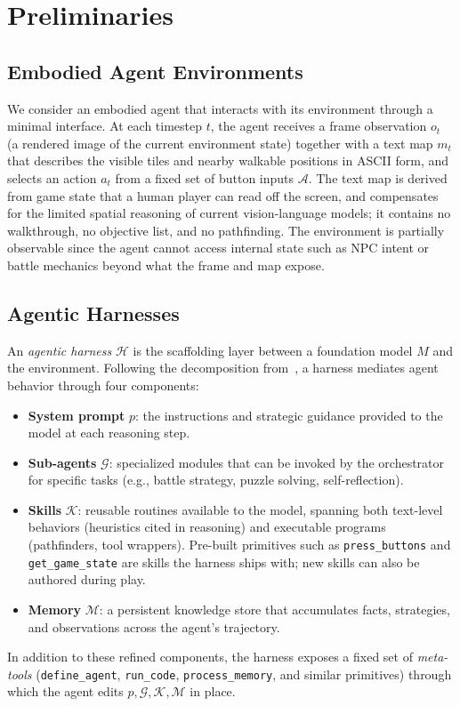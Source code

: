 \documentclass[11pt]{article}
\begin{document}
\section{Preliminaries}\label{sec:preliminaries}

\subsection{Embodied Agent Environments}

We consider an embodied agent that interacts with its environment through a minimal interface. At each timestep $t$, the agent receives a frame observation $o_t$ (a rendered image of the current environment state) together with a text map $m_t$ that describes the visible tiles and nearby walkable positions in ASCII form, and selects an action $a_t$ from a fixed set of button inputs $\mathcal{A}$. The text map is derived from game state that a human player can read off the screen, and compensates for the limited spatial reasoning of current vision-language models; it contains no walkthrough, no objective list, and no pathfinding. The environment is partially observable since the agent cannot access internal state such as NPC intent or battle mechanics beyond what the frame and map expose.

\subsection{Agentic Harnesses}

An \emph{agentic harness} $\mathcal{H}$ is the scaffolding layer between a foundation model $M$ and the environment. Following the decomposition from~\citet{karten2026pokeagent}, a harness mediates agent behavior through four components:
\begin{itemize}
    \item \textbf{System prompt} $p$: the instructions and strategic guidance provided to the model at each reasoning step.
    \item \textbf{Sub-agents} $\mathcal{G}$: specialized modules that can be invoked by the orchestrator for specific tasks (e.g., battle strategy, puzzle solving, self-reflection).
    \item \textbf{Skills} $\mathcal{K}$: reusable routines available to the model, spanning both text-level behaviors (heuristics cited in reasoning) and executable programs (pathfinders, tool wrappers). Pre-built primitives such as \texttt{press\_buttons} and \texttt{get\_game\_state} are skills the harness ships with; new skills can also be authored during play.
    \item \textbf{Memory} $\mathcal{M}$: a persistent knowledge store that accumulates facts, strategies, and observations across the agent's trajectory.
\end{itemize}
In addition to these refined components, the harness exposes a fixed set of \emph{meta-tools} (\texttt{define\_agent}, \texttt{run\_code}, \texttt{process\_memory}, and similar primitives) through which the agent edits $p, \mathcal{G}, \mathcal{K}, \mathcal{M}$ in place.
\end{document}
